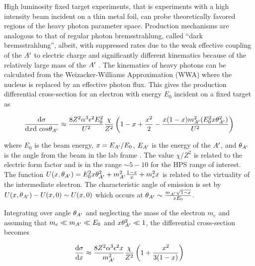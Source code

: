 High luminosity fixed target experiments, that is experiments with a high intensity beam incident on a thin metal foil, can probe theoretically favored regions of the heavy photon parameter space. Production mechanisms are analogous to that of regular photon bremsstrahlung, called ``dark bremsstrahlung'', albeit, with suppressed rates due to the weak effective coupling of the $A^\prime$ to electric charge and significantly different kinematics because of the relatively large mass of the $A^\prime$ \cite{Tsai:1973py}. The kinematics of heavy photons can be calculated from the Weizacker-Williams Approximation (WWA) where the nucleus is replaced by an effective photon flux. This gives the production differential cross-section for an electron with energy $E_0$ incident on a fixed target as 

\begin{equation}
    \frac{\mathrm{d}\sigma}{\mathrm{d}x \mathrm{d} \ cos \theta_{A^\prime}} \approx \frac{8Z^2 \alpha^3 \epsilon^2 E_0^2}{U^2} \frac{\chi}{Z^2} \left( 1-x+\frac{x^2}{2}-\frac{x(1-x)m^2_{A^\prime}(E_0^2x\theta^2_{A^\prime})}{U^2} 
    \right)
    \label{eqn:epsilon1}
\end{equation}

where $E_0$ is the beam energy, $x=E_{A^\prime}/E_0$, $E_{A^\prime}$ is the energy of the $A^\prime$, and $\theta_{A^\prime}$ is the angle from the beam in the lab frame \cite{Bjorken:2009mm} \cite{Beranek:2013yqa}. The value $\chi/Z^2$ is related to the electric form factor and is in the range $\sim 5-10$ for the HPS range of interest. The function $U(x,\theta_{A^\prime})=E_0^2x\theta_{A^\prime}^2+m_{A^\prime}^2 \frac{1-x}{x}+m_e^2 x$ is related to the virtuality of the intermediate electron. The characteristic angle of emission is set by $U(x,\theta_{A^\prime})-U(x,0) \sim U(x,0)$ which occurs at $\theta_{A^\prime} \sim \frac{m_{A^\prime} \sqrt{1-x}}{xE_0}$.

Integrating over angle $\theta_{A^\prime}$ and neglecting the mass of the electron $m_e$ and assuming that $m_e \ll m_{A^\prime} \ll E_0$ and $x\theta^2_{A^\prime} \ll 1$, the differential cross-section becomes

\begin{equation}
    \frac{\mathrm{d}\sigma}{\mathrm{d}x} \approx \frac{8Z^2 \alpha^3 \epsilon^2 x}{m_{A^\prime}^2} \frac{\chi}{Z^2} \left( 1+\frac{x^2}{3(1-x)} \right)
    \label{eqn:epsilon2}
\end{equation}


